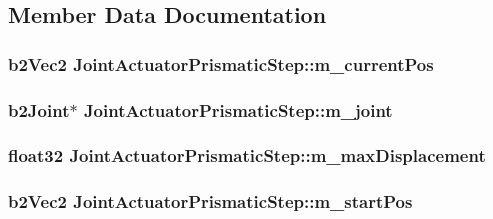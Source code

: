 \subsection{Member Data Documentation}
\hypertarget{classJointActuatorPrismaticStep_a13ea9ddc095eaf6e30d0dee871025b29}{
\subsubsection[{m\-\_\-current\-Pos}]{\setlength{\rightskip}{0pt plus 5cm}b2\-Vec2 Joint\-Actuator\-Prismatic\-Step\-::m\-\_\-current\-Pos}}\label{classJointActuatorPrismaticStep_a13ea9ddc095eaf6e30d0dee871025b29}
\hypertarget{classJointActuatorPrismaticStep_a0b0796c249dd6cecd0c0616a80885ab9}{
\subsubsection[{m\-\_\-joint}]{\setlength{\rightskip}{0pt plus 5cm}b2\-Joint$\ast$ Joint\-Actuator\-Prismatic\-Step\-::m\-\_\-joint}}\label{classJointActuatorPrismaticStep_a0b0796c249dd6cecd0c0616a80885ab9}
\hypertarget{classJointActuatorPrismaticStep_aa3c0a7f6384201a79b14b681d0b9f274}{
\subsubsection[{m\-\_\-max\-Displacement}]{\setlength{\rightskip}{0pt plus 5cm}float32 Joint\-Actuator\-Prismatic\-Step\-::m\-\_\-max\-Displacement}}\label{classJointActuatorPrismaticStep_aa3c0a7f6384201a79b14b681d0b9f274}
\hypertarget{classJointActuatorPrismaticStep_a48a004131133ef920d4bed5912519ffc}{
\subsubsection[{m\-\_\-start\-Pos}]{\setlength{\rightskip}{0pt plus 5cm}b2\-Vec2 Joint\-Actuator\-Prismatic\-Step\-::m\-\_\-start\-Pos}}\label{classJointActuatorPrismaticStep_a48a004131133ef920d4bed5912519ffc}
